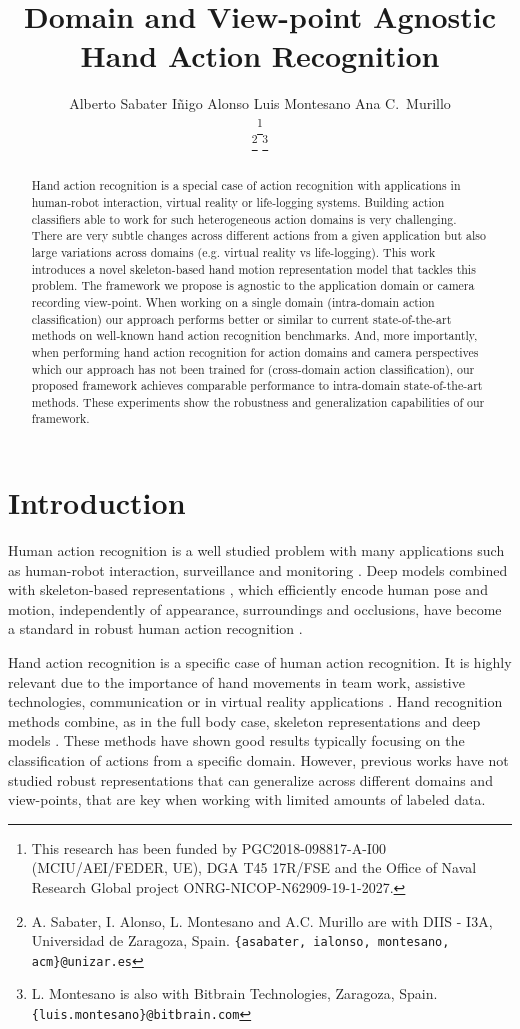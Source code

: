 \documentclass[letterpaper, 10 pt, conference]{ieeeconf}
\title{\LARGE \bf
Domain and View-point Agnostic Hand Action Recognition
}
\author{Alberto Sabater \hspace{0.5cm} Iñigo Alonso  \hspace{0.5cm} Luis Montesano \hspace{0.5cm} Ana C.~Murillo

\thanks{This research has been funded by PGC2018-098817-A-I00 (MCIU/AEI/FEDER, UE), DGA T45 17R/FSE and the Office of Naval Research Global project ONRG-NICOP-N62909-19-1-2027.}

\thanks{ A. Sabater, I. Alonso, L. Montesano and A.C. Murillo are with 
DIIS - I3A, Universidad de Zaragoza, Spain. {\tt\small \{asabater, ialonso, montesano, acm\}@unizar.es}}
\thanks{  L. Montesano is also with Bitbrain Technologies, Zaragoza, Spain. {\tt\small \{luis.montesano\}@bitbrain.com}}
}
\begin{document}
\maketitle
\thispagestyle{empty}
\pagestyle{empty}


\begin{abstract}
Hand action recognition is a special case of action recognition with applications in human-robot interaction, virtual reality or life-logging systems. Building action classifiers able to work for such heterogeneous action domains is very challenging. There are very subtle changes across different actions from a given application but also large variations across domains (e.g. virtual reality vs life-logging). This work introduces a novel skeleton-based hand motion representation model that tackles this problem. The framework we propose is agnostic to the application domain or camera recording view-point. When working on a single domain (intra-domain action classification) our approach performs better or similar to current state-of-the-art methods on well-known hand action recognition benchmarks. And, more importantly, when performing hand action recognition for action domains and camera perspectives which our approach has not been trained for (cross-domain action classification), our proposed framework achieves comparable performance to intra-domain state-of-the-art methods. These experiments show the robustness and generalization capabilities of our framework.


\end{abstract}

    


\section{Introduction}
Human action recognition is a well studied problem with many applications such as human-robot interaction, surveillance and monitoring \cite{krupke2018comparison, tanwani2017generative}. Deep models combined with skeleton-based representations \cite{moon2018v2v, xiong2019a2j}, which efficiently encode human pose and motion, independently of appearance, surroundings and occlusions, have become a standard in robust human action recognition \cite{perez2019interaction, zhang2019view}.

Hand action recognition is a specific case of human action recognition. It is highly relevant due to the importance of hand movements in team work, assistive technologies, communication or in virtual reality applications \cite{abbasi2019multimodal, bates2017line}. 
Hand recognition methods combine, as in the full body case, skeleton representations and deep models \cite{yang2019make, zhang2016efficient}. These methods have shown good results typically focusing  on the classification of actions from a specific domain.
However, previous works have not studied robust representations that can generalize across different domains and view-points, that are key when working with limited amounts of labeled data.  
\end{document}
